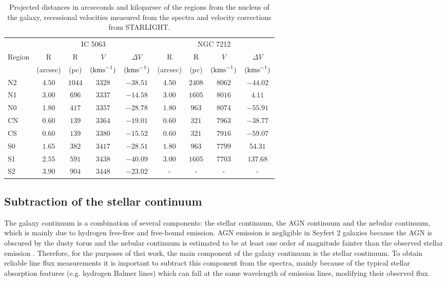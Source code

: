 \documentclass[../thesis.tex]{subfiles}
\begin{document}
\begin{table}
\caption[]{Projected distances in arcseconds and kiloparsec of the regions from the nucleus of the galaxy, recessional velocities measured from the spectra and velocity corrections from STARLIGHT.}
\label{tab:reg}
\centering
\small
\begin{tabular}[width=\columnwidth]{lcccccccc}
\hline
& \multicolumn{4}{c}{IC 5063}&\multicolumn{4}{c}{NGC 7212}\\
Region& R&R&$V$&$\Delta V$&R&R&$V$&$\Delta V$\\
& (arcsec)& (pc)&$(\si{\kms})$&$(\si{\kms})$&(arcsec)&(pc)&$(\si{\kms})$&$(\si{\kms})$\\
\hline
N2&$4.50$&$1044$&$3328$&$-38.51$&$4.50$&$2408$&$8062$&$-44.02$\\
N1&$3.00$&$696$&$3337$&$-14.58$&$3.00$&$1605$&$8016$&$4.11$\\
N0&$1.80$&$417$&$3357$&$-28.78$&$1.80$&$963$&$8074$&$-55.91$\\
CN&$0.60$&$139$&$3364$&$-19.01$&$0.60$&$321$&$7963$&$-38.77$\\
CS&$0.60$&$139$&$3380$&$-15.52$&$0.60$&$321$&$7916$&$-59.07$\\
S0&$1.65$&$382$&$3417$&$-28.51$&$1.80$&$963$&$7799$&$54.31$\\
S1&$2.55$&$591$&$3438$&$-40.09$&$3.00$&$1605$&$7703$&$137.68$\\
S2&$3.90$&$904$&$3448$&$-23.02$&-&-&-&-\\
\hline
\end{tabular}
\normalsize
\end{table}

\subsection{Subtraction of the stellar continuum}
\label{sec:starcont}


The galaxy continuum is a combination of several components: the stellar continuum, the AGN continuum and the nebular continuum, which is mainly due to hydrogen free-free and free-bound emission.
AGN emission is negligible in Seyfert 2 galaxies because the AGN is obscured by the dusty torus \citep[e.g.][]{Beckmann12} and the nebular continuum is estimated to be at least one order of magnitude fainter than the observed stellar emission \citep{OsterbrockAGN89}.
Therefore, for the purposes of thei work, the main component of the galaxy continuum is the stellar continuum.
To obtain reliable line flux measurements it is important to subtract this component from the spectra, mainly because of the typical stellar absorption features (e.g. hydrogen Balmer lines) which can fall at the same wavelength of emission lines, modifying their observed flux.
\end{document}
